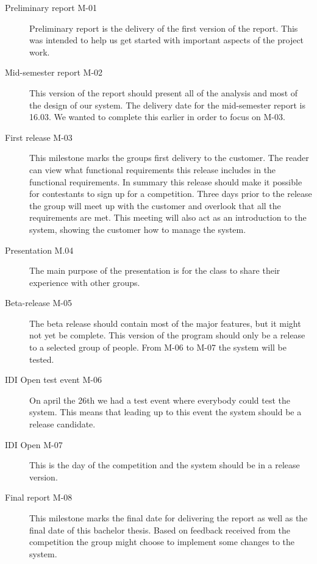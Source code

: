 \begin{description}
    \item[Preliminary report M-01]
    Preliminary report is the delivery of the first version of the report.
    This was intended to help us get started with important aspects of the
    project work.

    \item[Mid-semester report M-02]
    This version of the report should present all of the analysis and most
    of the design of our system. The delivery date for the mid-semester
    report is 16.03. We wanted to complete this earlier in order to focus
    on M-03.

    \item[First release M-03]
    This milestone marks the groups first delivery to the customer. The
    reader can view what functional requirements this release includes in
    the functional requirements. In summary this release should
    make it possible for contestants to sign up for a competition. Three
    days prior to the release the group will meet up with the customer and
    overlook that all the requirements are met. This meeting will also act
    as an introduction to the system, showing the customer how to manage
    the system. 

    \item[Presentation M.04]
    The main purpose of the presentation is for the class to share their
    experience with other groups. 

    \item[Beta-release M-05]
    The beta release should contain most of the major features, but it might
    not yet be complete. This version of the program should only be a
    release to a selected group of people. From M-06 to M-07 the system
    will be tested.

    \item[IDI Open test event M-06]
    On april the 26th we had a test event where everybody could test the
    system. This means that leading up to this event the system should be a
    release candidate. 

    \item[IDI Open M-07]
    This is the day of the competition and the system should be in a release
    version. 

    \item[Final report M-08]
    This milestone marks the final date for delivering the report as well as
    the final date of this bachelor thesis. Based on feedback received
    from the competition the group might choose to implement some changes
    to the system. 
\end{description}

